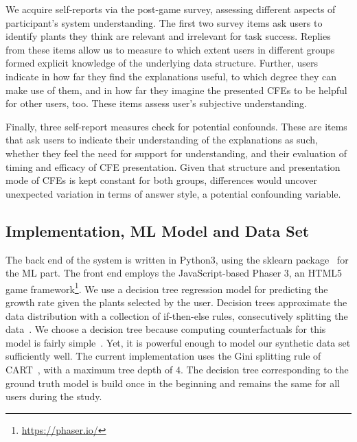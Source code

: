 We acquire self-reports via the post-game survey, assessing different aspects of participant's system understanding. 
The first two survey items ask users to identify plants they think are relevant and irrelevant for task success. 
Replies from these items allow us to measure to which extent users in different groups formed explicit knowledge of the underlying data structure. 
Further, users indicate in how far they find the explanations useful, to which degree they can make use of them, and in how far they imagine the presented \glspl{CFE} to be helpful for other users, too. These items assess user's subjective understanding.

Finally, three self-report measures check for potential confounds. 
These are items that ask users to indicate their understanding of the explanations as such, whether they feel the need for support for understanding, and their evaluation of timing and efficacy of \gls{CFE} presentation.
Given that structure and presentation mode of \glspl{CFE} is kept constant for both groups, differences would uncover unexpected variation in terms of answer style, a potential confounding variable.

\subsection{Implementation, ML Model and Data Set}
The back end of the system is written in Python3, using the sklearn package~\citep{pedregosa_scikit-learn_2011} for the \gls{ML} part. The front end employs the JavaScript-based Phaser 3, an HTML5 game framework\footnote{\url{https://phaser.io/}}.
We use a decision tree regression model for predicting the growth rate given the plants selected by the user.
Decision trees approximate the data distribution with a collection of if-then-else rules, consecutively splitting the data~\citep{shalev-shwartz_understanding_2014}.
We choose a decision tree because computing counterfactuals for this model is fairly simple~\citep{artelt_computation_2019}.
Yet, it is powerful enough to model our synthetic data set sufficiently well.
The current implementation uses the Gini splitting rule of CART~\citep{breiman_classification_1984}, with a maximum tree depth of $4$.
The decision tree corresponding to the ground truth model is build once in the beginning and remains the same for all users during the study. 


